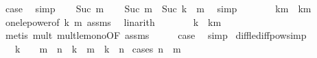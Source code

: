\begin{isabellebody}
\ {\isacharquery}{\kern0pt}case\ \isamarkupfalse%
\ simp\isanewline
{}\isamarkupfalse%
\isanewline
\ \ \isamarkupfalse%
\ {\isacharparenleft}{\kern0pt}Suc\ m{\isacharparenright}{\kern0pt}\isanewline
\ \ \isamarkupfalse%
\ {\isachardoublequoteopen}Suc\ m\ {\isasymle}\ Suc\ {\isacharparenleft}{\kern0pt}k\ {\isacharcircum}{\kern0pt}\ m{\isacharparenright}{\kern0pt}{\isachardoublequoteclose}\ \isamarkupfalse%
\ simp\isanewline
\ \ \isamarkupfalse%
\ \isamarkupfalse%
\ {\isachardoublequoteopen}{\isachardot}{\kern0pt}{\isachardot}{\kern0pt}{\isachardot}{\kern0pt}\ {\isasymle}\ k{\isacharcircum}{\kern0pt}m\ {\isacharplus}{\kern0pt}\ k{\isacharcircum}{\kern0pt}m{\isachardoublequoteclose}\ \isamarkupfalse%
\ one{\isacharunderscore}{\kern0pt}le{\isacharunderscore}{\kern0pt}power{\isacharbrackleft}{\kern0pt}of\ k\ m{\isacharbrackright}{\kern0pt}\ assms\ \isamarkupfalse%
\ linarith\isanewline
\ \ \isamarkupfalse%
\ \isamarkupfalse%
\ {\isachardoublequoteopen}{\isachardot}{\kern0pt}{\isachardot}{\kern0pt}{\isachardot}{\kern0pt}\ {\isasymle}\ k\ {\isacharasterisk}{\kern0pt}\ k{\isacharcircum}{\kern0pt}m{\isachardoublequoteclose}\ \isamarkupfalse%
\ {\isacharparenleft}{\kern0pt}metis\ mult{\isacharunderscore}{\kern0pt}{}\ mult{\isacharunderscore}{\kern0pt}le{\isacharunderscore}{\kern0pt}mono{}{\isacharbrackleft}{\kern0pt}OF\ assms{\isacharbrackright}{\kern0pt}{\isacharparenright}{\kern0pt}\isanewline
\ \ \isamarkupfalse%
\ \isamarkupfalse%
\ {\isacharquery}{\kern0pt}case\ \isamarkupfalse%
\ simp\isanewline
{}\isamarkupfalse%
%
\endisatagproof
{\isafoldproof}%
%
\isadelimproof
\isanewline
%
\endisadelimproof
\isanewline
{}\isamarkupfalse%
\ diff{\isacharunderscore}{\kern0pt}le{\isacharunderscore}{\kern0pt}diff{\isacharunderscore}{\kern0pt}pow{\isacharbrackleft}{\kern0pt}simp{\isacharbrackright}{\kern0pt}{\isacharcolon}{\kern0pt}\isanewline
\ \ \ {\isachardoublequoteopen}k\ {\isasymge}\ {}{\isachardoublequoteclose}\ \ {\isachardoublequoteopen}m\ {\isacharminus}{\kern0pt}\ n\ {\isasymle}\ k\ {\isacharcircum}{\kern0pt}\ m\ {\isacharminus}{\kern0pt}\ k\ {\isacharcircum}{\kern0pt}\ n{\isachardoublequoteclose}\isanewline
%
\isadelimproof
%
\endisadelimproof
%
\isatagproof
{}\isamarkupfalse%
\ {\isacharparenleft}{\kern0pt}cases\ {\isachardoublequoteopen}n\ {\isasymle}\ m{\isachardoublequoteclose}{\isacharparenright}{\kern0pt}\isanewline

\end{isabellebody}
